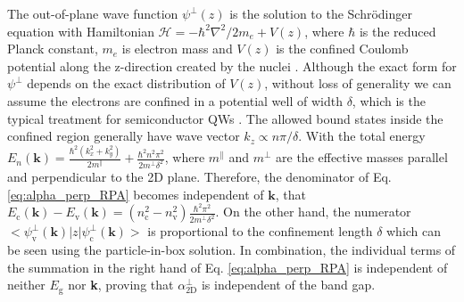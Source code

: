 \documentclass[journal=ancac3,email=true,hyperref=true,keywords=false]{achemso}
\begin{document}
The out-of-plane wave function $\psi^{\perp}(z)$ is the solution to the Schr\"{o}dinger equation with
Hamiltonian $\mathcal{H} = -\hbar^{2} \nabla^{2}/2m_{e} + V(z)$, where
$\hbar$ is the reduced Planck constant, $m_{e}$ is electron mass and
$V(z)$ is the confined Coulomb potential along the z-direction
created by the nuclei
\cite{davies_physics_1997,ihn_semiconductor_2009}. Although the exact
form for $\psi^{\perp}$ depends on the exact distribution of $V(z)$,
without loss of generality we can assume the electrons are confined in
a potential well of width $\delta$, which is the typical treatment for
semiconductor QWs \cite{ihn_semiconductor_2009,Fowler_1984,Maize_2011}. 
The allowed bound
states inside the confined region generally have wave vector
$k_{z} \propto n \pi / \delta$. With the total energy
$E_{n}(\mathbf{k}) = {\displaystyle \frac{\hbar^{2} (k_{x}^{2} +
    k_{y}^{2})}{2 m^{\parallel}} + \frac{\hbar^{2} n^{2} \pi^{2}}{2
    m^{\perp} \delta^{2}}}$, where $m^{\parallel}$ and $m^{\perp}$ are
the effective masses parallel and perpendicular to the 2D
plane. Therefore, the denominator of Eq. \ref{eq:alpha_perp_RPA} becomes independent of
$\mathbf{k}$, that
$E_{\mathrm{c}}(\mathbf{k}) - E_{\mathrm{v}}(\mathbf{k}) =
(n_{\mathrm{c}}^{2} - n_{\mathrm{v}}^{2}) {\displaystyle
  \frac{\hbar^{2} \pi^{2}}{2 m^{\perp} \delta^{2}}}$. On the other
hand, the numerator
$<\psi^{\perp}_{\mathrm{v}}(\mathbf{k})|z|\psi^{\perp}_{\mathrm{c}}(\mathbf{k})>$
is proportional to the confinement length $\delta$ which can be seen using the 
particle-in-box solution\cite{davies_physics_1997}. In combination,
the individual terms of the summation in the right hand of Eq. \ref{eq:alpha_perp_RPA} is
independent of neither $E_{\mathrm{g}}$ nor \textbf{k}, proving that
$\alpha_{\mathrm{2D}}^{\perp}$ is independent of the band gap.
%
\end{document}
